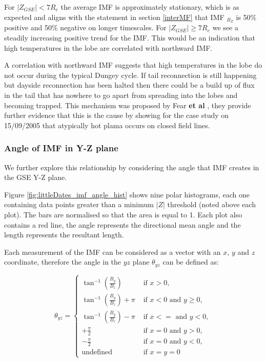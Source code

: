 \documentclass[12pt]{article}
\begin{document}
For $|Z_{GSE}|<7R_e$ the average IMF is approximately stationary, which is as expected and aligns with the statement in section \ref{interMF} that IMF $_B_Z$ is 50\% positive and 50\% negative on longer timescales. For $|Z_{GSE}|\ge7R_e$ we see a steadily increasing positive trend for the IMF. This would be an indication that high temperatures in the lobe are correlated with northward IMF. 

A correlation with northward IMF suggests that high temperatures in the lobe do not occur during the typical Dungey cycle. If tail reconnection is still happening but dayside reconnection has been halted then there could be a build up of flux in the tail that has nowhere to go apart from spreading into the lobes and becoming trapped. This mechanism was proposed by Fear \textbf{et al} \cite{Fear1506}, they provide further evidence that this is the cause by showing for the case study on 15/09/2005 that atypically hot plama occurs on closed field lines.

\subsubsection{Angle of IMF in Y-Z plane}
We further explore this relationship by considering the angle that IMF creates in the GSE Y-Z plane.

Figure \ref{fig:littleDates_imf_angle_hist} shows nine polar histograms, each one containing data points greater than a minimum $|Z|$ threshold (noted above each plot). The bars are normalised so that the area is equal to 1. Each plot also contains a red line, the angle represents the directional mean angle \cite{mardia_jupp_2000} and the length represents the resultant length. 

Each measurement of the IMF can be considered as a vector with an $x$, $y$ and $z$ coordinate, therefore the angle in the $yz$ plane $\theta_{yz}$ can be defined as:

\begin{equation}
    \theta_{yz}= 
    \begin{cases}
        \tan^{-1}\left(\frac{B_y}{B_z}\right) &\text{ if } x>0, \\
        \tan^{-1}\left(\frac{B_y}{B_z}\right)+\pi &\text{ if } x < 0 \text{ and } y \ge 0, \\
        \tan^{-1}\left(\frac{B_y}{B_z}\right)-\pi &\text{ if } x<= \text{ and } y < 0, \\
        +\frac{\pi}{2} &\text{ if } x=0 \text{ and } y > 0, \\
        -\frac{\pi}{2} &\text{ if } x=0 \text{ and } y<0, \\
        \text{undefined} &\text{ if } x=y=0
    \end{cases}
\end{equation}
\end{document}
